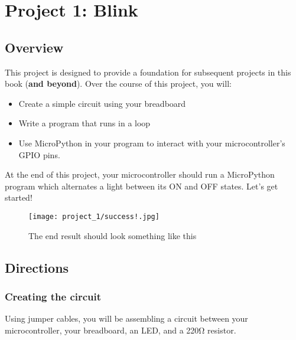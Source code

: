\chapter{Project 1: Blink}

\section{Overview}
This project is designed to provide a foundation for subsequent projects in this book (\textbf{and beyond}). Over the course of this project, you will:
\begin{itemize}
\item Create a simple circuit using your breadboard
\item Write a program that runs in a loop
\item Use MicroPython in your program to interact with your microcontroller's GPIO pins.
\end{itemize}
At the end of this project, your microcontroller should run a MicroPython program which alternates a light between its ON and OFF states. Let's get started!
\begin{figure}[h!]
\centering
    \texttt{[image: project\_1/success!.jpg]}
    \caption{The end result should look something like this}
    \label{fig:end_result}
\end{figure}

\section{Directions}

\subsection{Creating the circuit}
Using jumper cables, you will be assembling a circuit between your microcontroller, your breadboard, an LED, and a 220\si{\ohm} resistor.

